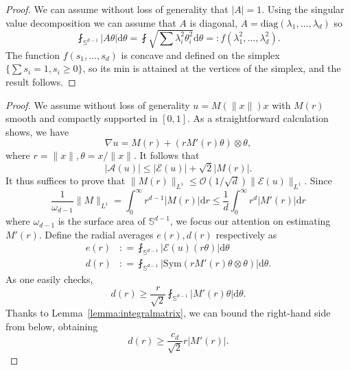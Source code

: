 \documentclass[11pt, a4paper]{amsart}
\theoremstyle{definition}
\theoremstyle{remark}
\begin{document}
\begin{proof}
We can assume without loss of generality that $|A|=1$.
Using the singular value decomposition
we can assume that $A$ is diagonal,
$A=\mathrm{diag}(\lambda_1,\dots, \lambda_d)$ so
\begin{equation*}
\fint_{\mathbb{S}^{d-1}}|A\theta|\mathrm{d}\theta
=\fint \sqrt{\sum \lambda_i^2\theta_i^2}\mathrm{d}\theta
=\colon f(\lambda_1^2,\dots, \lambda_d^2).
\end{equation*}
The function $f(s_1,\dots, s_d)$ is concave
and defined on
the simplex $\{\sum s_i=1, s_i\ge 0\}$,
so its min is attained at the vertices of the simplex,
and the result follows.
\end{proof}
\begin{proof}
We assume without loss of generality
$u=M(\|x\|)x$ with $M(r)$
smooth and compactly supported in $[0,1]$.
As a straightforward calculation shows, we have
\begin{equation*}
\nabla u= M(r)+(rM'(r) \theta)\otimes \theta,
\end{equation*}
where $r=\|x\|, \theta=x/\|x\|$. It follows that
\begin{equation*}
    |\mathcal A(u)|\le |\mathcal E(u)|+\sqrt 2 |M(r)|.
\end{equation*}
It thus suffices to prove that
$\|M(r)\|_{L^1}\le
\mathcal O\left(1/\sqrt d\right)
\|\mathcal E(u)\|_{L^1}$.
Since
\begin{equation*}
    \frac{1}{\omega_{d-1}}\|M\|_{L^1}=
    \int_0^\infty r^{d-1}|M(r)|\mathrm{d}r\le
    \frac1d \int_0^\infty r^{d}|M'(r)|\mathrm{d}r
\end{equation*}
where $\omega_{d-1}$ is the surface area
of $\mathbb S^{d-1}$,
we focus our attention on estimating $M'(r)$.
Define the radial averages
$e(r), d(r)$ respectively as
\begin{align*}
e(r)
&\mathrel{:}=
\fint_{\mathbb S^{d-1}}
|\mathcal E(u)(r\theta)|\mathrm{d}\theta\\ 
d(r)
&\mathrel{:}=
\fint_{\mathbb S^{d-1}}
|\mathrm{Sym}(rM'(r)\theta\otimes \theta)|
\mathrm{d}\theta.
\end{align*}
As one easily checks, 
\begin{equation*}
d(r)\ge \frac{r}{\sqrt{2}}
\fint_{\mathbb S^{d-1}} |M'(r)\theta|\mathrm{d}\theta.
\end{equation*}
Thanks to Lemma~\ref{lemma:integralmatrix},
we can bound the right-hand side from below, obtaining
\begin{equation*}
d(r)\ge \frac{c_d}{\sqrt{2}}r|M'(r)|.
\end{equation*}

\end{proof}
\end{document}
